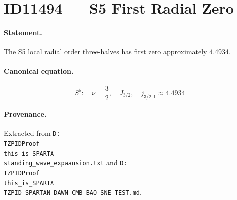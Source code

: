 \section*{ID11494 --- S5 First Radial Zero}

\paragraph{Statement.}
The S5 local radial order three-halves has first zero approximately 4.4934.

\paragraph{Canonical equation.}
\[
S^5:\quad\nu=\frac32,\quad J_{3/2},\quad j_{3/2,1}\approx4.4934
\]

\paragraph{Provenance.}
Extracted from \texttt{D:\\TZPIDProof\\this\_is\_SPARTA\\standing\_wave\_expaansion.txt} and \texttt{D:\\TZPIDProof\\this\_is\_SPARTA\\TZPID\_SPARTAN\_DAWN\_CMB\_BAO\_SNE\_TEST.md}.
